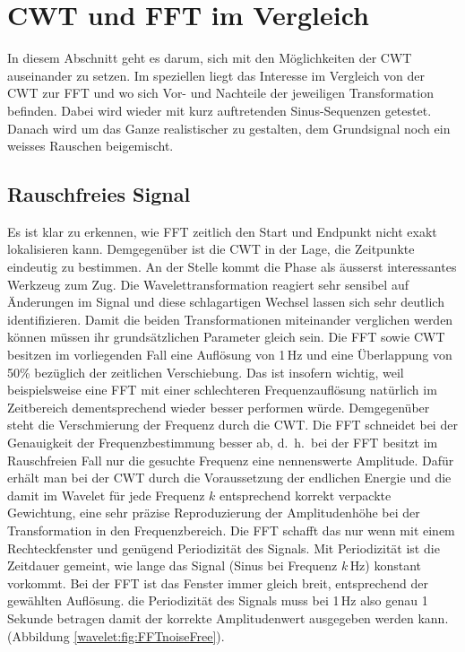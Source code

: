 %
%
%
%
\section{CWT und FFT im Vergleich
	\label{wavelets:section:teil4}}

In diesem Abschnitt geht es darum, sich mit den Möglichkeiten der
CWT auseinander zu setzen.
Im speziellen liegt das Interesse im Vergleich von der CWT zur FFT
und wo sich Vor- und Nachteile der jeweiligen Transformation befinden.
Dabei wird wieder mit kurz auftretenden Sinus-Sequenzen getestet.
Danach wird um das Ganze realistischer zu gestalten, dem Grundsignal
noch ein weisses Rauschen beigemischt.

\subsection{Rauschfreies Signal
	\label{wavelets:subsection:CWTvsFFTRauschfrei}}
Es ist klar zu erkennen, wie FFT zeitlich den Start und Endpunkt
nicht exakt lokalisieren kann.
Demgegenüber ist die CWT in der Lage, die Zeitpunkte eindeutig zu
bestimmen.
An der Stelle kommt die Phase als äusserst interessantes Werkzeug
zum Zug.
Die Wavelettransformation reagiert sehr sensibel auf Änderungen im
Signal und diese schlagartigen Wechsel lassen sich sehr deutlich
identifizieren.
Damit die beiden Transformationen miteinander verglichen werden
können müssen ihr grundsätzlichen Parameter gleich sein.
Die FFT sowie CWT besitzen im vorliegenden Fall eine Auflösung von
1\,Hz und eine Überlappung von 50\% bezüglich der zeitlichen Verschiebung.
Das ist insofern wichtig, weil beispielsweise eine FFT mit einer
schlechteren Frequenzauflösung natürlich im Zeitbereich dementsprechend
wieder besser performen würde.
Demgegenüber steht die Verschmierung der Frequenz durch die CWT.
Die FFT schneidet bei der Genauigkeit der Frequenzbestimmung besser
ab, d.~h.~bei der FFT besitzt im Rauschfreien Fall nur die gesuchte
Frequenz eine nennenswerte Amplitude.
Dafür erhält man bei der CWT durch die Voraussetzung der endlichen
Energie und die damit im Wavelet für jede Frequenz $k$ entsprechend
korrekt verpackte Gewichtung, eine sehr präzise Reproduzierung der
Amplitudenhöhe bei der Transformation in den Frequenzbereich.
Die FFT schafft das nur wenn mit einem Rechteckfenster und genügend
Periodizität des Signals.
Mit Periodizität ist die Zeitdauer gemeint, wie lange das Signal
(Sinus bei Frequenz $k\,$Hz) konstant vorkommt.
Bei der FFT ist das Fenster immer gleich breit, entsprechend der
gewählten Auflösung.
die Periodizität des Signals muss bei 1\,Hz also genau 1 Sekunde
betragen damit der korrekte Amplitudenwert ausgegeben werden
kann.(Abbildung \ref{wavelet:fig:FFTnoiseFree}).

